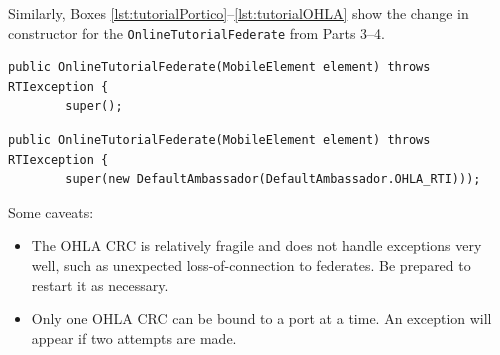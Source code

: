 \documentclass[]{article}
\begin{document}
Similarly, Boxes \ref{lst:tutorialPortico}--\ref{lst:tutorialOHLA} show the change in constructor for the \texttt{OnlineTutorialFederate} from Parts 3--4.

\begin{Code}
\begin{lstlisting}[caption={OnlineTutorialFederate constructor with Portico RTI},label={lst:tutorialPortico}]
	public OnlineTutorialFederate(MobileElement element) throws RTIexception {
		super();
\end{lstlisting}

\begin{lstlisting}[caption={OnlineTutorialFederate constructor with OHLA RTI},label={lst:tutorialOHLA}]
	public OnlineTutorialFederate(MobileElement element) throws RTIexception {
		super(new DefaultAmbassador(DefaultAmbassador.OHLA_RTI)));
\end{lstlisting}
\end{Code}

Some caveats:
\begin{itemize}
\item The OHLA CRC is relatively fragile and does not handle exceptions very well, such as unexpected loss-of-connection to federates. Be prepared to restart it as necessary.
\item Only one OHLA CRC can be bound to a port at a time. An exception will appear if two attempts are made.
\end{itemize}
\end{document}
